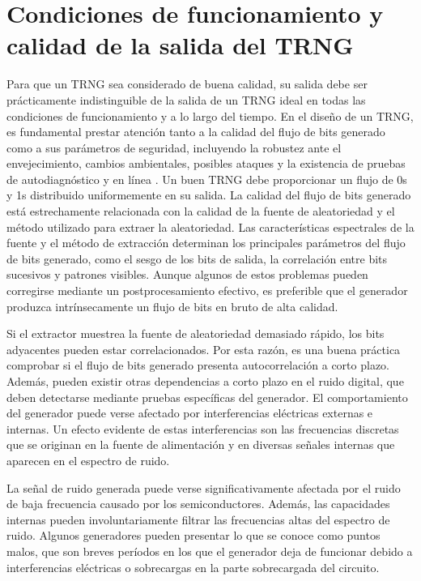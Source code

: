    \section{Condiciones de funcionamiento y calidad de la salida del TRNG}

            Para que un TRNG sea considerado de buena calidad, su salida debe ser prácticamente indistinguible de la salida de un TRNG ideal en todas las condiciones de funcionamiento y a lo largo del tiempo. En el diseño de un TRNG, es fundamental prestar atención tanto a la calidad del flujo de bits generado como a sus parámetros de seguridad, incluyendo la robustez ante el envejecimiento, cambios ambientales, posibles ataques y la existencia de pruebas de autodiagnóstico y en línea \cite{Schindler2003}.
            Un buen TRNG debe proporcionar un flujo de 0s y 1s distribuido uniformemente en su salida. La calidad del flujo de bits generado está estrechamente relacionada con la calidad de la fuente de aleatoriedad y el método utilizado para extraer la aleatoriedad. Las características espectrales de la fuente y el método de extracción determinan los principales parámetros del flujo de bits generado, como el sesgo de los bits de salida, la correlación entre bits sucesivos y patrones visibles. Aunque algunos de estos problemas pueden corregirse mediante un postprocesamiento efectivo, es preferible que el generador produzca intrínsecamente un flujo de bits en bruto de alta calidad.

            Si el extractor muestrea la fuente de aleatoriedad demasiado rápido, los bits adyacentes pueden estar correlacionados. Por esta razón, es una buena práctica comprobar si el flujo de bits generado presenta autocorrelación a corto plazo. Además, pueden existir otras dependencias a corto plazo en el ruido digital, que deben detectarse mediante pruebas específicas del generador. El comportamiento del generador puede verse afectado por interferencias eléctricas externas e internas. Un efecto evidente de estas interferencias son las frecuencias discretas que se originan en la fuente de alimentación y en diversas señales internas que aparecen en el espectro de ruido.

            La señal de ruido generada puede verse significativamente afectada por el ruido de baja frecuencia causado por los semiconductores. Además, las capacidades internas pueden involuntariamente filtrar las frecuencias altas del espectro de ruido. Algunos generadores pueden presentar lo que se conoce como puntos malos, que son breves períodos en los que el generador deja de funcionar debido a interferencias eléctricas o sobrecargas en la parte sobrecargada del circuito.

